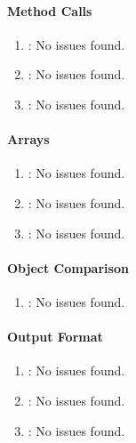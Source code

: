 \paragraph{Method Calls} %
\label{par:method_calls}

\begin{enumerate} [resume]
	\item \emph{\checkAH}: No issues found.
	\item \emph{\checkAI}: No issues found.
	\item \emph{\checkAJ}: No issues found.
\end{enumerate} 

\paragraph{Arrays} %
\label{par:arrays}

\begin{enumerate} [resume]
	\item \emph{\checkAK}: No issues found.
	\item \emph{\checkAL}: No issues found.
	\item \emph{\checkAM}: No issues found.
\end{enumerate}

\paragraph{Object Comparison} %
\label{par:object_comparison}

\begin{enumerate} [resume]
	\item \emph{\checkAN}: No issues found.
\end{enumerate}

\paragraph{Output Format} %
\label{par:output_format}

\begin{enumerate} [resume]
	\item \emph{\checkAO}: No issues found.
	\item \emph{\checkAP}: No issues found.
	\item \emph{\checkAQ}: No issues found.
\end{enumerate}

